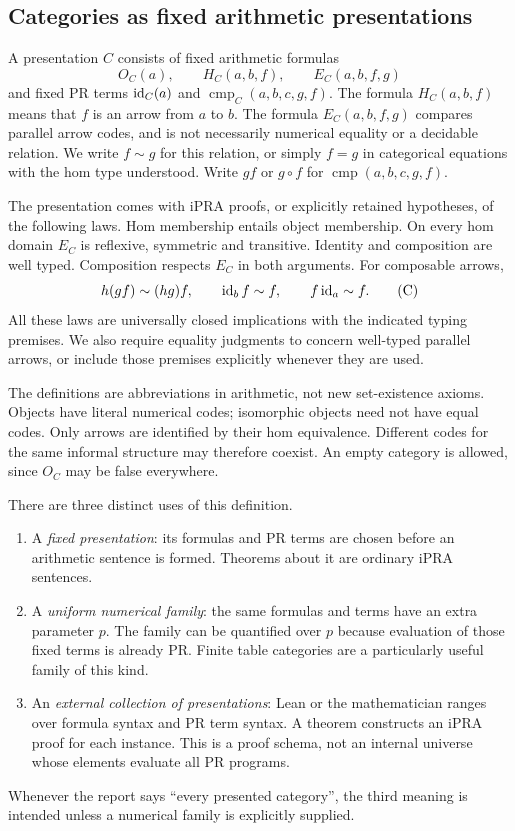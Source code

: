 \subsection{Categories as fixed arithmetic presentations}
\begin{definition}\label{def:category}
A presentation $C$ consists of fixed arithmetic formulas
\[
 O_C(a),\qquad H_C(a,b,f),\qquad E_C(a,b,f,g)
\]
and fixed PR terms $\operatorname{id}_C(a)$ and $\operatorname{cmp}_C(a,b,c,g,f)$.
The formula $H_C(a,b,f)$ means that $f$ is an arrow from $a$ to $b$.
The formula $E_C(a,b,f,g)$ compares parallel arrow codes, and is not
necessarily numerical equality or a decidable relation. We write $f\sim g$
for this relation, or simply $f=g$ in categorical equations with the hom
type understood. Write $gf$ or $g\circ f$ for $\operatorname{cmp}(a,b,c,g,f)$.

The presentation comes with iPRA proofs, or explicitly retained hypotheses,
of the following laws. Hom membership entails object membership. On every
hom domain $E_C$ is reflexive, symmetric and transitive. Identity and
composition are well typed. Composition respects $E_C$ in both arguments.
For composable arrows,
\[
 h(gf)\sim(hg)f,\qquad \operatorname{id}_b f\sim f,\qquad f\operatorname{id}_a\sim f.       \tag{C}
\]
All these laws are universally closed implications with the indicated
typing premises. We also require equality judgments to concern well-typed
parallel arrows, or include those premises explicitly whenever they are used.
\end{definition}

The definitions are abbreviations in arithmetic, not new set-existence
axioms. Objects have literal numerical codes; isomorphic objects need not
have equal codes. Only arrows are identified by their hom equivalence.
Different codes for the same informal structure may therefore coexist.
An empty category is allowed, since $O_C$ may be false everywhere.

There are three distinct uses of this definition.
\begin{enumerate}
\item A \emph{fixed presentation}: its formulas and PR terms are chosen
before an arithmetic sentence is formed. Theorems about it are ordinary
iPRA sentences.
\item A \emph{uniform numerical family}: the same formulas and terms have
an extra parameter $p$. The family can be quantified over $p$ because
evaluation of those fixed terms is already PR. Finite table categories
are a particularly useful family of this kind.
\item An \emph{external collection of presentations}: Lean or the
mathematician ranges over formula syntax and PR term syntax. A theorem
constructs an iPRA proof for each instance. This is a proof schema, not
an internal universe whose elements evaluate all PR programs.
\end{enumerate}
Whenever the report says ``every presented category'', the third meaning
is intended unless a numerical family is explicitly supplied.

